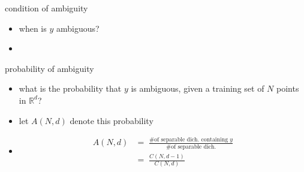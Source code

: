 \documentclass[aspectratio=169, 11pt, handout]{beamer}
\begin{document}
\begin{frame}{condition of ambiguity}
  \begin{itemize}
  \item when is $y$ ambiguous?
  \item {

    }
  \end{itemize} 
\end{frame}

\begin{frame}{probability of ambiguity}
  \begin{itemize}[<+->]
  \item what is the probability that $y$ is ambiguous, given a training set of $N$ points in $\mathbb{R}^d$?
  \item let $A(N, d)$ denote this probability 
  \item[] {
      \begin{align*}
        A(N, d) &=\; \frac{\text{\# of separable dich. containing } y}{\text{\# of separable dich.}}\\
                &=\; \frac{C(N, d-1)}{C(N, d)}
      \end{align*}
    }
  \end{itemize}
\end{frame}
\end{document}
